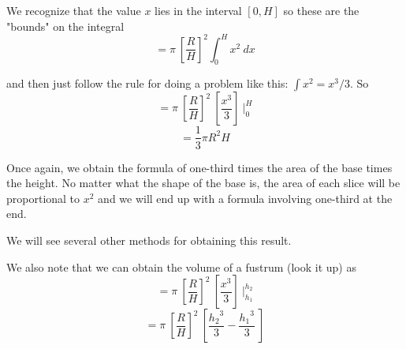 \documentclass[11pt, oneside]{article}
\begin{document}
We recognize that the value $x$ lies in the interval $[0,H]$ so these are the "bounds" on the integral
\[ = \pi \ [ \frac{R}{H} ]^2 \int_0^H x^2 \ dx \]

and then just follow the rule for doing a problem like this:  $\int x^2 = x^3/3$.  So
\[ = \pi \ [ \frac{R}{H} ]^2 \ [  \frac{x^3}{3} ] \ \bigg |_0^H \]
\[ = \frac{1}{3} \pi R^2 H \]

Once again, we obtain the formula of one-third times the area of the base times the height.  No matter what the shape of the base is, the area of each slice will be proportional to $x^2$ and we will end up with a formula involving one-third at the end.

We will see several other methods for obtaining this result.

We also note that we can obtain the volume of a fustrum (look it up) as
\[ = \pi \ [ \frac{R}{H} ]^2 \ [  \frac{x^3}{3} ] \ \bigg |_{h_1}^{h_2} \]
\[ = \pi \ [ \frac{R}{H} ]^2 \ [  \frac{{h_2}^3}{3} -  \frac{{h_1}^3}{3}  \ ] \]
\end{document}
